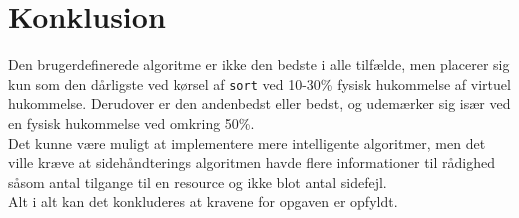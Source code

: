 \section{Konklusion}
Den brugerdefinerede algoritme er ikke den bedste i alle tilfælde, men placerer sig kun som den dårligste ved kørsel af \texttt{sort} ved 10-30\% fysisk hukommelse af virtuel hukommelse. Derudover er den andenbedst eller bedst, og udemærker sig især ved en fysisk hukommelse ved omkring 50\%.\\

Det kunne være muligt at implementere mere intelligente algoritmer, men det ville kræve at sidehåndterings algoritmen havde flere informationer til rådighed såsom antal tilgange til en resource og ikke blot antal sidefejl.\\

Alt i alt kan det konkluderes at kravene for opgaven er opfyldt.